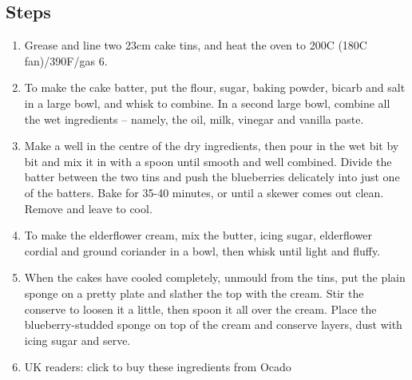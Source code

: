 \documentclass{book}
\begin{document}
\subsection*{Steps}
\begin{enumerate}
\item Grease and line two 23cm cake tins, and heat the oven to 200C (180C fan)/390F/gas 6.
\item To make the cake batter, put the flour, sugar, baking powder, bicarb and salt in a large bowl, and whisk to combine. In a second large bowl, combine all the wet ingredients – namely, the oil, milk, vinegar and vanilla paste.
\item Make a well in the centre of the dry ingredients, then pour in the wet bit by bit and mix it in with a spoon until smooth and well combined. Divide the batter between the two tins and push the blueberries delicately into just one of the batters. Bake for 35-40 minutes, or until a skewer comes out clean. Remove and leave to cool.
\item To make the elderflower cream, mix the butter, icing sugar, elderflower cordial and ground coriander in a bowl, then whisk until light and fluffy.
\item When the cakes have cooled completely, unmould from the tins, put the plain sponge on a pretty plate and slather the top with the cream. Stir the conserve to loosen it a little, then spoon it all over the cream. Place the blueberry-studded sponge on top of the cream and conserve layers, dust with icing sugar and serve.
\item UK readers: click to buy these ingredients from Ocado
\end{enumerate}
\newpage
\end{document}

